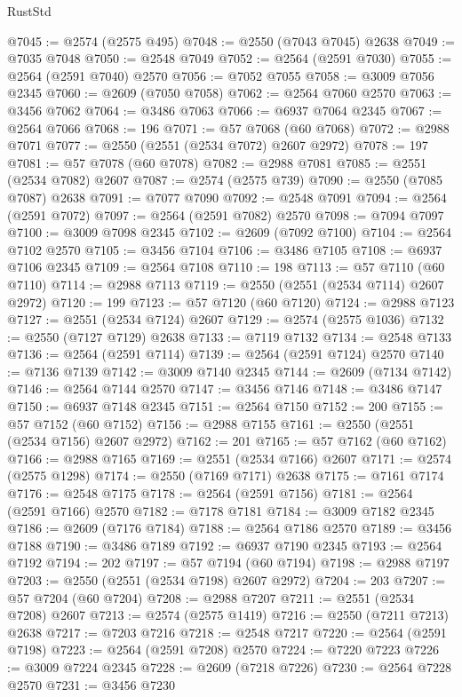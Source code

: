 \begin{lexlean}{RustStd}
\begin{coremodule}
@7045 := @2574 (@2575 @495)
@7048 := @2550 (@7043 @7045) @2638
@7049 := @7035 @7048
@7050 := @2548 @7049
@7052 := @2564 (@2591 @7030)
@7055 := @2564 (@2591 @7040) @2570
@7056 := @7052 @7055
@7058 := @3009 @7056 @2345
@7060 := @2609 (@7050 @7058)
@7062 := @2564 @7060 @2570
@7063 := @3456 @7062
@7064 := @3486 @7063
@7066 := @6937 @7064 @2345
@7067 := @2564 @7066
@7068 := 196
@7071 := @57 @7068 (@60 @7068)
@7072 := @2988 @7071
@7077 := @2550 (@2551 (@2534 @7072) @2607 @2972)
@7078 := 197
@7081 := @57 @7078 (@60 @7078)
@7082 := @2988 @7081
@7085 := @2551 (@2534 @7082) @2607
@7087 := @2574 (@2575 @739)
@7090 := @2550 (@7085 @7087) @2638
@7091 := @7077 @7090
@7092 := @2548 @7091
@7094 := @2564 (@2591 @7072)
@7097 := @2564 (@2591 @7082) @2570
@7098 := @7094 @7097
@7100 := @3009 @7098 @2345
@7102 := @2609 (@7092 @7100)
@7104 := @2564 @7102 @2570
@7105 := @3456 @7104
@7106 := @3486 @7105
@7108 := @6937 @7106 @2345
@7109 := @2564 @7108
@7110 := 198
@7113 := @57 @7110 (@60 @7110)
@7114 := @2988 @7113
@7119 := @2550 (@2551 (@2534 @7114) @2607 @2972)
@7120 := 199
@7123 := @57 @7120 (@60 @7120)
@7124 := @2988 @7123
@7127 := @2551 (@2534 @7124) @2607
@7129 := @2574 (@2575 @1036)
@7132 := @2550 (@7127 @7129) @2638
@7133 := @7119 @7132
@7134 := @2548 @7133
@7136 := @2564 (@2591 @7114)
@7139 := @2564 (@2591 @7124) @2570
@7140 := @7136 @7139
@7142 := @3009 @7140 @2345
@7144 := @2609 (@7134 @7142)
@7146 := @2564 @7144 @2570
@7147 := @3456 @7146
@7148 := @3486 @7147
@7150 := @6937 @7148 @2345
@7151 := @2564 @7150
@7152 := 200
@7155 := @57 @7152 (@60 @7152)
@7156 := @2988 @7155
@7161 := @2550 (@2551 (@2534 @7156) @2607 @2972)
@7162 := 201
@7165 := @57 @7162 (@60 @7162)
@7166 := @2988 @7165
@7169 := @2551 (@2534 @7166) @2607
@7171 := @2574 (@2575 @1298)
@7174 := @2550 (@7169 @7171) @2638
@7175 := @7161 @7174
@7176 := @2548 @7175
@7178 := @2564 (@2591 @7156)
@7181 := @2564 (@2591 @7166) @2570
@7182 := @7178 @7181
@7184 := @3009 @7182 @2345
@7186 := @2609 (@7176 @7184)
@7188 := @2564 @7186 @2570
@7189 := @3456 @7188
@7190 := @3486 @7189
@7192 := @6937 @7190 @2345
@7193 := @2564 @7192
@7194 := 202
@7197 := @57 @7194 (@60 @7194)
@7198 := @2988 @7197
@7203 := @2550 (@2551 (@2534 @7198) @2607 @2972)
@7204 := 203
@7207 := @57 @7204 (@60 @7204)
@7208 := @2988 @7207
@7211 := @2551 (@2534 @7208) @2607
@7213 := @2574 (@2575 @1419)
@7216 := @2550 (@7211 @7213) @2638
@7217 := @7203 @7216
@7218 := @2548 @7217
@7220 := @2564 (@2591 @7198)
@7223 := @2564 (@2591 @7208) @2570
@7224 := @7220 @7223
@7226 := @3009 @7224 @2345
@7228 := @2609 (@7218 @7226)
@7230 := @2564 @7228 @2570
@7231 := @3456 @7230

\end{coremodule}
\end{lexlean}
